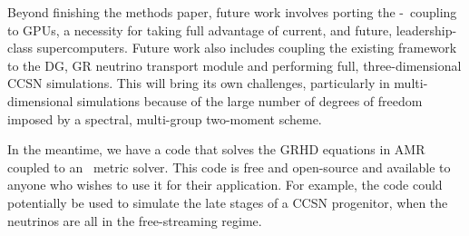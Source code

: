 Beyond finishing the methods paper, future work involves porting the
\thornado-\amrex\ coupling to GPUs,
a necessity for taking full advantage of current, and future,
leadership-class supercomputers.
Future work also includes coupling the existing framework to the DG, GR
neutrino transport module and performing full, three-dimensional
CCSN simulations.
This will bring its own challenges, particularly in multi-dimensional simulations
because of the large number of degrees of freedom imposed by a spectral,
multi-group two-moment scheme.

In the meantime, we have a code that solves the GRHD equations in AMR coupled
to an \xcfc\ metric solver.
This code is free and open-source and available to anyone who wishes to use it
for their application.
For example, the code could potentially be used to simulate the late stages
of a CCSN progenitor, when the neutrinos are all in the free-streaming regime.
